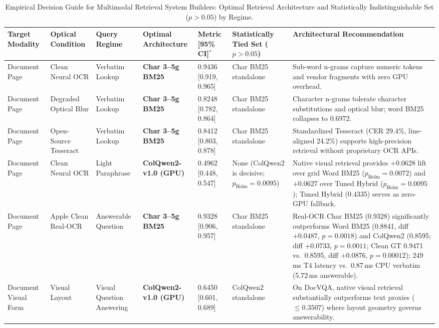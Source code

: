 \begin{table}[t]
\centering\footnotesize
\setlength{\tabcolsep}{2.5pt}
\caption{Empirical Decision Guide for Multimodal Retrieval System Builders: Optimal Retrieval Architecture and Statistically Indistinguishable Set ($p > 0.05$) by Regime.}\label{tab:decision_guide_v6}
\begin{tabular}{@{}p{1.6cm}p{1.8cm}p{1.8cm}p{2.1cm}p{1.8cm}p{2.3cm}p{4.1cm}@{}}
\toprule
\textbf{Target Modality} & \textbf{Optical Condition} & \textbf{Query Regime} & \textbf{Optimal Architecture} & \textbf{Metric [95\% CI]}$^*$ & \makecell[c]{\textbf{Statistically}\\\textbf{Tied Set}\\\scriptsize($p > 0.05$)} & \textbf{Architectural Recommendation} \\
\midrule
Document Page & Clean Neural OCR & Verbatim Lookup & \textbf{Char 3--5g BM25} & 0.9436 [0.919, 0.965] & Char BM25 standalone & Sub-word n-grams capture numeric tokens and vendor fragments with zero GPU overhead. \\
Document Page & Degraded Optical Blur & Verbatim Lookup & \textbf{Char 3--5g BM25} & 0.8248 [0.782, 0.864] & Char BM25 standalone & Character n-grams tolerate character substitutions and optical blur; word BM25 collapses to 0.6972. \\
Document Page & Open-Source Tesseract & Verbatim Lookup & \textbf{Char 3--5g BM25} & 0.8412 [0.803, 0.878] & Char BM25 standalone & Standardized Tesseract (CER 29.4\%, line-aligned 24.2\%) supports high-precision retrieval without proprietary OCR APIs. \\
Document Page & Clean Neural OCR & Light Paraphrase & \textbf{ColQwen2-v1.0 (GPU)} & 0.4962 [0.448, 0.547] & None (ColQwen2 is decisive; $p_{\text{Holm}} = 0.0095$) & Native visual retrieval provides +0.0628 lift over grid Word BM25 ($p_{\text{Holm}} = 0.0072$) and +0.0627 over Tuned Hybrid ($p_{\text{Holm}} = 0.0095$); Tuned Hybrid (0.4335) serves as zero-GPU fallback. \\
Document Page & Apple Clean Real-OCR & Answerable Question & \textbf{Char 3--5g BM25} & 0.9328 [0.906, 0.957] & Char BM25 standalone & Real-OCR Char BM25 (0.9328) significantly outperforms Word BM25 (0.8841, diff $+0.0487$, $p=0.0018$) and ColQwen2 (0.8595; diff $+0.0733$, $p = 0.0011$; Clean GT 0.9471 vs.\ 0.8595, diff $+0.0876$, $p=0.00012$); 249\,ms T4 latency vs.\ 0.87\,ms CPU verbatim (5.72\,ms answerable). \\
Document Visual Form & Visual Layout & Visual Question Answering & \textbf{ColQwen2-v1.0 (GPU)} & 0.6450 [0.601, 0.689] & ColQwen2 standalone & On DocVQA, native visual retrieval substantially outperforms text proxies ($\le 0.3507$) where layout geometry governs answerability. \\

\end{tabular}
\end{table}
